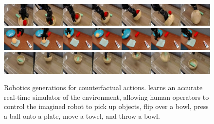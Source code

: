 \begin{figure}[t!]
\centering
\vspace*{-1ex}
\includegraphics[width=\linewidth]{figures/robotics/soar1} \\[1ex]
\includegraphics[width=\linewidth]{figures/robotics/soar2} \\[1ex]
\includegraphics[width=\linewidth]{figures/robotics/soar3}
\caption{
Robotics generations for counterfactual actions.
\method learns an accurate real-time simulator of the environment, allowing human operators to control the imagined robot to pick up objects, flip over a bowl, press a ball onto a plate, move a towel, and throw a bowl.
}
\label{fig:robotics}
\end{figure}
